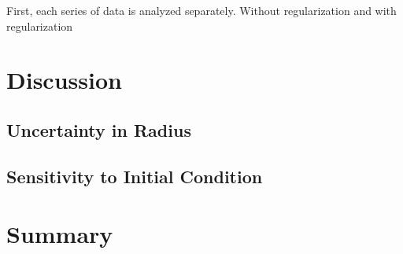 \documentclass[iop,numberedappendix,apj,]{emulateapj}
\begin{document}
First, each series of data is analyzed separately. 
Without regularization and with regularization

\section{Discussion}
\label{s:discussion}


\subsection{Uncertainty in Radius}
\label{ss:radius}

\subsection{Sensitivity to Initial Condition}
\label{ss:initialcondition}


\section{Summary}
\label{s:summary}




\acknowledgments


\end{document}
